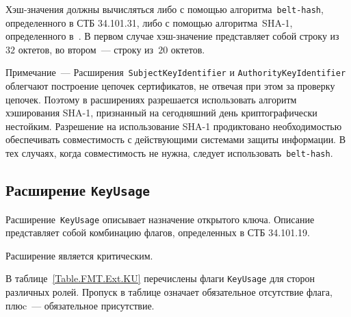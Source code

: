 Хэш-значения должны вычисляться либо с помощью алгоритма~\texttt{belt-hash}, 
определенного в СТБ 34.101.31, либо с помощью алгоритма~SHA-1,
определенного в~\cite{SHA1}. В первом случае хэш-значение 
представляет собой строку из~$32$ октетов, во втором~--- 
строку из~$20$ октетов.

\begin{note}
Примечание~--- 
Расширения~\texttt{SubjectKeyIdentifier} и \texttt{AuthorityKeyIdentifier}
облегчают построение цепочек сертификатов, не отвечая при этом за проверку 
цепочек. Поэтому в расширениях разрешается использовать алгоритм хэширования
SHA-1, признанный на сегодняшний день криптографически нестойким.
Разрешение на использование SHA-1  продиктовано необходимостью 
обеспечивать совместимость с действующими системами защиты информации. 
В тех случаях, когда совместимость не нужна, следует 
использовать~\texttt{belt-hash}.
\end{note}

\subsection{Расширение \texttt{KeyUsage}}\label{FMT.Ext.KU}

Расширение~\texttt{KeyUsage} описывает назначение открытого ключа. 
Описание представляет собой комбинацию флагов, определенных в СТБ 34.101.19.

Расширение является критическим.

В таблице~\ref{Table.FMT.Ext.KU} перечислены флаги \texttt{KeyUsage} 
для сторон различных ролей. 
%
Пропуск в таблице означает обязательное отсутствие флага,
плюc~--- обязательное присутствие.

